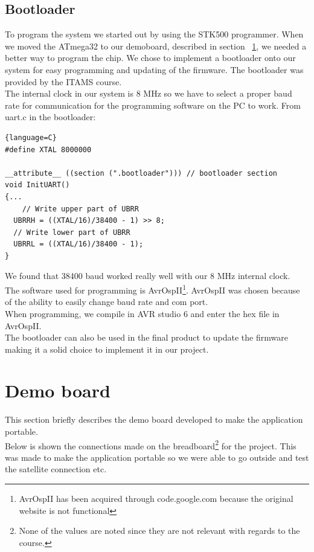 \subsection{Bootloader}
To program the system we started out by using the STK500 programmer. When we moved the ATmega32 to our demoboard, described in section~ \ref{sec:demob}, we needed a better way to program the chip. We chose to implement a bootloader onto our system for easy programming and updating of the firmware. The bootloader was provided by the ITAMS course.\\
The internal clock in our system is 8 MHz so we have to select a proper baud rate for communication for the programming software on the PC to work. From uart.c in the bootloader:
\begin{lstlisting}{language=C}
#define XTAL 8000000  

__attribute__ ((section (".bootloader"))) // bootloader section
void InitUART()
{...
	// Write upper part of UBRR
  UBRRH = ((XTAL/16)/38400 - 1) >> 8;
  // Write lower part of UBRR
  UBRRL = ((XTAL/16)/38400 - 1);
}
\end{lstlisting}
We found that 38400 baud worked really well with our 8 MHz internal clock.\\
The software used for programming is AvrOspII\footnote{AvrOspII has been acquired through code.google.com because the original website is not functional}. AvrOspII was chosen because of the ability to easily change baud rate and com port.\\
When programming, we compile in AVR studio 6 and enter the hex file in AvrOspII.\\
The bootloader can also be used in the final product to update the firmware making it a solid choice to implement it in our project.\\

\section{Demo board}
\label{sec:demob}
This section briefly describes the demo board developed to make the application portable.\\
Below is shown the connections made on the breadboard\footnote{None of the values are noted since they are not relevant with regards to the course.} for the project. This was made to make the application portable so we were able to go outside and test the satellite connection etc.\\


